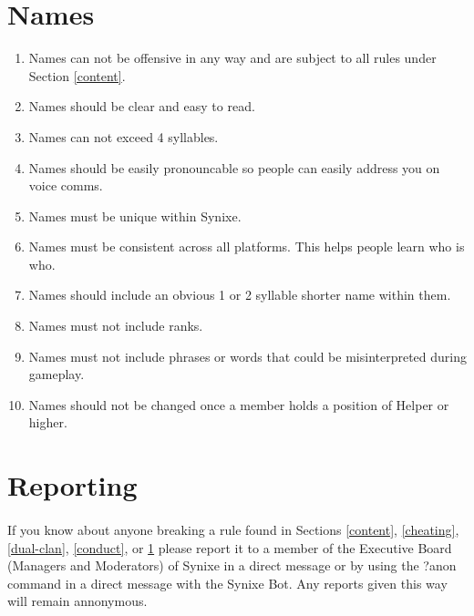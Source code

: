 \documentclass[10pt,a4paper]{article}
\begin{document}
\section{Names} \label{names}
\begin{enumerate}
	\item Names can not be offensive in any way and are subject to all rules under Section \ref{content}.
	\item Names should be clear and easy to read.
	\item Names can not exceed 4 syllables.
	\item Names should be easily pronouncable so people can easily address you on voice comms.
	\item Names must be unique within Synixe.
	\item Names must be consistent across all platforms. This helps people learn who is who.
	\item Names should include an obvious 1 or 2 syllable shorter name within them.
	\item Names must not include ranks.
	\item Names must not include phrases or words that could be misinterpreted during gameplay.
	\item Names should not be changed once a member holds a position of Helper or higher.
\end{enumerate}
\section{Reporting}
\paragraph{}
If you know about anyone breaking a rule found in Sections \ref{content}, \ref{cheating}, \ref{dual-clan}, \ref{conduct}, or \ref{names} please report it to a member of the Executive Board (Managers and Moderators) of Synixe in a direct message or by using the ?anon command in a direct message with the Synixe Bot. Any reports given this way will remain annonymous.
\end{document}
